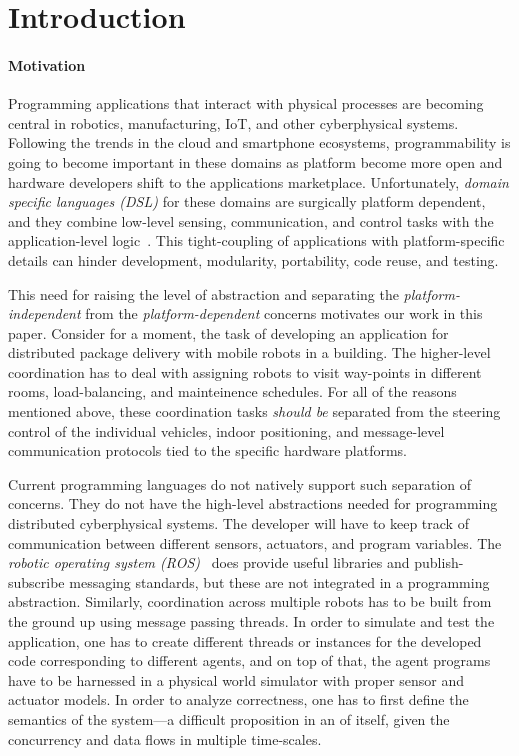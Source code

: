 \section{Introduction}
\label{sec:intro}

\paragraph{Motivation}
Programming applications that interact with physical processes are becoming central in  robotics, manufacturing, IoT, and other cyberphysical systems.  Following the trends in the cloud and smartphone ecosystems, programmability is going to become  important in these domains as platform become more open and hardware developers shift to the  applications marketplace. Unfortunately, {\em domain specific languages (DSL)\/} for these domains are surgically platform dependent, and they combine  low-level sensing, communication, and control tasks with the application-level logic~\cite{nordmann2014robotics}. This  tight-coupling of applications with platform-specific details can hinder development, modularity, portability, code reuse, and testing. 

This need for raising the level of abstraction and separating the \emph{platform-independent} from the \emph{platform-dependent} concerns motivates our work in this paper. Consider for a moment, the task of developing an application for distributed package delivery with mobile robots in a building. The higher-level coordination has to deal with assigning robots to visit way-points in different rooms, load-balancing, and mainteinence schedules.  For all of the reasons mentioned above, these coordination tasks {\em should be\/} separated from the  steering control of the individual vehicles, indoor positioning, and message-level communication protocols tied to the specific hardware platforms. 

Current programming languages do not natively support such separation of concerns. They do not have the high-level abstractions needed for programming distributed cyberphysical systems.  The developer will have to keep track of communication between different sensors, actuators, and program variables. The {\em robotic operating system (ROS)}~\cite{rosbridge_suite,ros} does provide useful libraries and  publish-subscribe messaging standards, but these are not integrated in a programming abstraction. Similarly, coordination across multiple robots has to be built from the ground up using message passing threads. In order to simulate and test the application, one has to create different threads or instances for the developed code corresponding to different agents, and on top of that, the agent programs have to be harnessed in a physical world simulator with proper sensor and actuator models. In order to analyze correctness, one has to first define the semantics of the system---a difficult proposition in an of itself, given the concurrency and data flows in multiple time-scales. 

